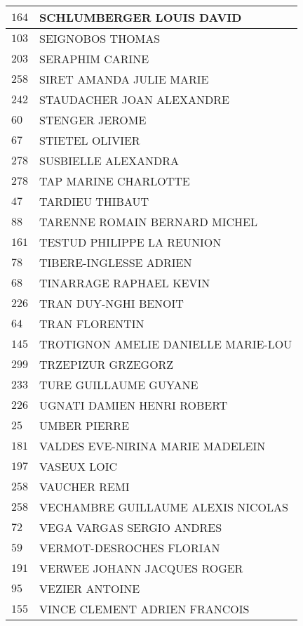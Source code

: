 \begin{xltabular}{\linewidth}{|l|X|}
    \hline
    $164$ & SCHLUMBERGER LOUIS DAVID \\
    \hline
    $103$ & SEIGNOBOS THOMAS \\
    \hline
    $203$ & SERAPHIM CARINE \\
    \hline
    $258$ & SIRET AMANDA JULIE MARIE \\
    \hline
    $242$ & STAUDACHER JOAN ALEXANDRE \\
    \hline
    $60$ & STENGER JEROME \\
    \hline
    $67$ & STIETEL OLIVIER \\
    \hline
    $278$ & SUSBIELLE ALEXANDRA \\
    \hline
    $278$ & TAP MARINE CHARLOTTE \\
    \hline
    $47$ & TARDIEU THIBAUT \\
    \hline
    $88$ & TARENNE ROMAIN BERNARD MICHEL \\
    \hline
    $161$ & TESTUD PHILIPPE LA REUNION \\
    \hline
    $78$ & TIBERE-INGLESSE ADRIEN \\
    \hline
    $68$ & TINARRAGE RAPHAEL KEVIN \\
    \hline
    $226$ & TRAN DUY-NGHI BENOIT \\
    \hline
    $64$ & TRAN FLORENTIN \\
    \hline
    $145$ & TROTIGNON AMELIE DANIELLE MARIE-LOU \\
    \hline
    $299$ & TRZEPIZUR GRZEGORZ \\
    \hline
    $233$ & TURE GUILLAUME GUYANE \\
    \hline
    $226$ & UGNATI DAMIEN HENRI ROBERT \\
    \hline
    $25$ & UMBER PIERRE \\
    \hline
    $181$ & VALDES EVE-NIRINA MARIE MADELEIN \\
    \hline
    $197$ & VASEUX LOIC \\
    \hline
    $258$ & VAUCHER REMI \\
    \hline
    $258$ & VECHAMBRE GUILLAUME ALEXIS NICOLAS \\
    \hline
    $72$ & VEGA VARGAS SERGIO ANDRES \\
    \hline
    $59$ & VERMOT-DESROCHES FLORIAN \\
    \hline
    $191$ & VERWEE JOHANN JACQUES ROGER \\
    \hline
    $95$ & VEZIER ANTOINE \\
    \hline
    $155$ & VINCE CLEMENT ADRIEN FRANCOIS \\

\end{xltabular}
